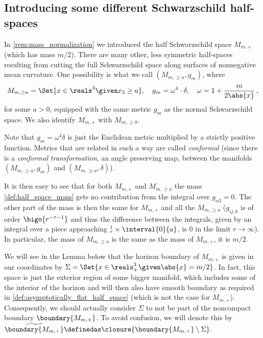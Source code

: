 \documentclass[titlepage,numbers=noenddot,oneside,%
cleardoublepage=empty,paper=a4,fontsize=11pt,%
english,%
]{scrartcl}
\newcommand*{\mathcomma}{\,,}
\let\sphere\relax
\newcommand{\sphere}{\mathbb{S}}
\begin{document}
\subsection{Introducing some different Schwarzschild half-spaces}
In \cref{rem:mass_normalization} we introduced the half Schwarzschild space \( M_{m,+} \) (which has mass \( m/2 \)). There are many other, less symmetric half-spaces resulting from cutting the full Schwarzschild space along surfaces of nonnegative mean curvature. One possibility is what we call \( (M_{m,\geq a},g_m) \), where
\begin{equation*}
    M_{m,\geq a}=\Set{x\in \reals^3\given x_3\geq a},\quad g_m=\omega^4\cdot \delta,\quad \omega=1+\frac{m}{2\abs{x}}\mathcomma
\end{equation*}
for some \( a>0 \), equipped with the same metric \( g_m \) as the normal Schwarzschild space. We also identify \( M_{m,+} \) with \( M_{m,\geq 0} \). 


Note that \( g_m=\omega^4 \delta \) is just the Euclidean metric multiplied by a strictly positive function. Metrics that are related in such a way are called \emph{conformal} (since there is a \emph{conformal transformation}, \ie an angle preserving map, between the manifolds \( (M_{m,\geq a},g_m) \) and \( (M_{m,\geq a},\delta) \)).

It is then easy to see that for both \( M_{m,+} \) and \( M_{m,\geq a} \) the mass \cref{def:half_space_mass} gets no contribution from the integral over \( g_{\alpha 3}=0 \). The other part of the mass is then the same for \( M_{m,+} \) and all the \( M_{m,\geq a} \) (\( g_{ij,k} \) is of order \( \bigo{r^{-\tau-1}} \) and thus the difference between the integrals, given by an integral over a piece approaching \( \sphere^1_r\times \interval{0}{a} \), is \( 0 \) in the limit \( r\to \infty \)). In particular, the mass of \( M_{m,\geq a} \) is the same as the mass of \( M_{m,+} \), \ie it is \( m/2 \).


\newcommand{\schwarzschildboundary}{\widetilde{\boundary{M_{m,+}}}}
\newcommand{\modifiedschwarzschildboundary}{\boundary{M_{m,\geq a}}}


We will see in the Lemma below that the horizon boundary of \( M_{m,+} \) is given in our coordinates by \( \Sigma=\Set{x\in \reals^3_+\given \abs{x}=m/2} \). In fact, this space is just the exterior region of some bigger manifold, which includes some of the interior of the horizon and will then also have smooth boundary as required in \cref{def:asymptotically_flat_half_space} (which is not the case for \( M_{m,+} \)). Consequently, we should actually consider \( \Sigma \) to not be part of the noncompact boundary \( \boundary{M_{m,+}} \). To avoid confusion, we will denote this by \( \schwarzschildboundary\definedas \closure{\boundary{M_{m,+}}\setminus \Sigma} \).
\end{document}
